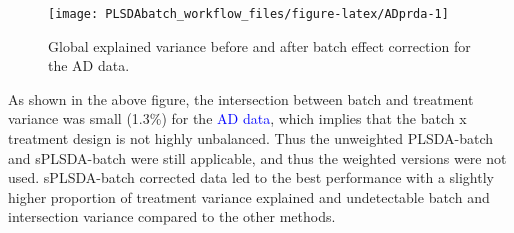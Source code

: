 \documentclass[
]{book}
\begin{document}
\begin{figure}

{\centering \texttt{[image: PLSDAbatch\_workflow\_files/figure-latex/ADprda-1]} 

}

\caption{Global explained variance before and after batch effect correction for the AD data.}\label{fig:ADprda}
\end{figure}

As shown in the above figure, the intersection between batch and treatment variance was small (1.3\%) for the \textcolor{blue}{AD data}, which implies that the batch x treatment design is not highly unbalanced. Thus the unweighted PLSDA-batch and sPLSDA-batch were still applicable, and thus the weighted versions were not used. sPLSDA-batch corrected data led to the best performance with a slightly higher proportion of treatment variance explained and undetectable batch and intersection variance compared to the other methods.
\end{document}
